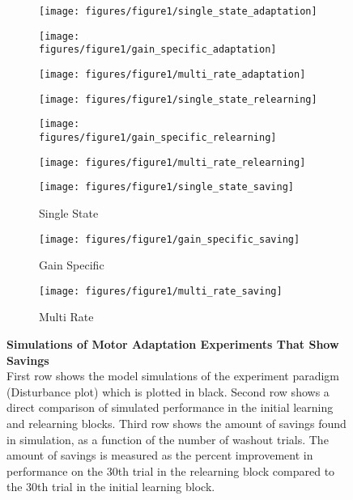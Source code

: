 \documentclass[9pt,twocolumn]{paper-template}
\begin{document}
\begin{figure*}[h!]
  \centering
  \begin{subfigure}[b]{0.32\linewidth}
    \texttt{[image: figures/figure1/single\_state\_adaptation]}
  \end{subfigure}
  \begin{subfigure}[b]{0.32\linewidth}
    \texttt{[image: figures/figure1/gain\_specific\_adaptation]}
  \end{subfigure}
   \begin{subfigure}[b]{0.32\linewidth}
    \texttt{[image: figures/figure1/multi\_rate\_adaptation]}
  \end{subfigure}
    \begin{subfigure}[b]{0.32\linewidth}
    \texttt{[image: figures/figure1/single\_state\_relearning]}
  \end{subfigure}
  \begin{subfigure}[b]{0.32\linewidth}
    \texttt{[image: figures/figure1/gain\_specific\_relearning]}
  \end{subfigure}
   \begin{subfigure}[b]{0.32\linewidth}
    \texttt{[image: figures/figure1/multi\_rate\_relearning]}
  \end{subfigure}
      \begin{subfigure}[b]{0.32\linewidth}
    \texttt{[image: figures/figure1/single\_state\_saving]}
    \caption{Single State}
  \end{subfigure}
  \begin{subfigure}[b]{0.32\linewidth}
    \texttt{[image: figures/figure1/gain\_specific\_saving]}
        \caption{Gain Specific}
  \end{subfigure}
   \begin{subfigure}[b]{0.32\linewidth}
    \texttt{[image: figures/figure1/multi\_rate\_saving]}
        \caption{Multi Rate}
  \end{subfigure}
  \caption{\textbf{Simulations of Motor Adaptation Experiments That Show Savings}\\
  {First row} shows the model simulations of the experiment paradigm (Disturbance plot) which is plotted in black. {Second row} shows a direct comparison of simulated performance in the initial learning and relearning blocks.  {Third row} shows the amount of savings found in simulation, as a function of the number of washout trials. The amount of savings is measured as the percent improvement in performance on the 30th trial in the relearning block compared to the 30th trial in the initial learning block. 
}
  \label{fig:saving}
\end{figure*}
\end{document}
